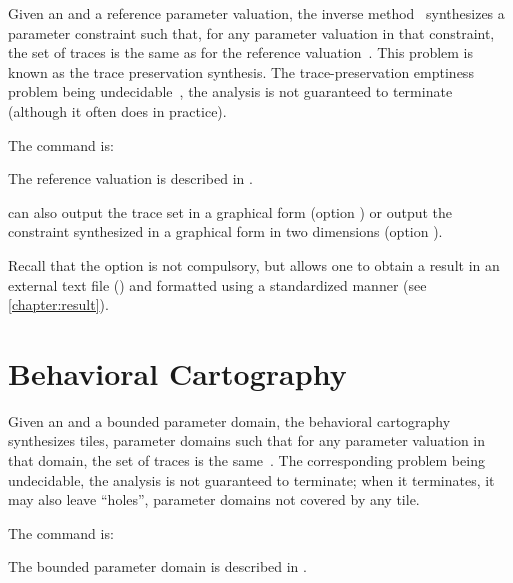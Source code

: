 Given an \NIPTA{} and a reference parameter valuation, the inverse method~\IM{} synthesizes a parameter constraint such that, for any parameter valuation in that constraint, the set of traces is the same as for the reference valuation~\cite{ACEF09}.
This problem is known as the trace preservation synthesis.
The trace-preservation emptiness problem being undecidable~\cite{AM15}, the analysis is not guaranteed to terminate (although it often does in practice).

The command is:


The reference valuation is described in .

\imitator{} can also
	output the trace set in a graphical form (option )
	or
	output the constraint synthesized in a graphical form in two dimensions (option ).

Recall that the option  is not compulsory, but allows one to obtain a result in an external text file () and formatted using a standardized manner (see \cref{chapter:result}). %




\section{Behavioral Cartography}\label{ss:mode:BC}

Given an \NIPTA{} and a bounded parameter domain, the behavioral cartography~\BC{} synthesizes tiles, \ie{} parameter domains such that for any parameter valuation in that domain, the set of traces is the same~\cite{AF10}.
The corresponding problem being undecidable, the analysis is not guaranteed to terminate; when it terminates, it may also leave ``holes'', \ie{} parameter domains not covered by any tile.

The command is:


The bounded parameter domain is described in .


